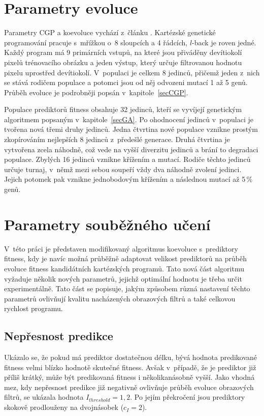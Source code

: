 \section{Parametry evoluce}

Parametry CGP a koevoluce vychází z~článku \cite{SikuPPSN}. Kartézské genetické programování pracuje s~mřížkou o~8 sloupcích a 4 řádcích, $l$-back je roven jedné. Každý program má 9 primárních vstupů, na které jsou přiváděny devítiokolí pixelů trénovacího obrázku a jeden výstup, který určuje filtrovanou hodnotu pixelu uprostřed devítiokolí. V~populaci je celkem 8 jedinců, přičemž jeden z~nich se stává rodičem populace a potomci jsou od něj odvozeni mutací 1 až 5 genů. Průběh evoluce je podrobněji popsán v~kapitole~\ref{secCGP}.

Populace prediktorů fitness obsahuje 32 jedinců, kteří se vyvíjejí genetickým algoritmem popsaným v~kapitole~\ref{secGA}. Po ohodnocení jedinců v~populaci je tvořena nová třemi druhy jedinců. Jedna čtvrtina nové populace vznikne prostým zkopírováním nejlepších 8 jedinců z~předešlé generace. Druhá čtvrtina je vytvořena zcela náhodně, což vede na vyšší diverzitu jedinců a brání to degradaci populace. Zbylých 16 jedinců vznikne křížením a mutací. Rodiče těchto jedinců určuje turnaj, v~němž mezi sebou soupeří vždy dva náhodně zvolení jedinci. Jejich potomek pak vznikne jednobodovým křížením a následnou mutací až 5\,\% genů.

\section{Parametry souběžného učení}

V~této práci je představen modifikovaný algoritmus koevoluce s~prediktory fitness, kdy je navíc možná průběžně adaptovat velikost prediktorů na průběh evoluce fitness kandidátních kartézských programů. Tato nová část algoritmu vyžaduje několik nových parametrů, jejichž optimální hodnotu je třeba určit experimentálně. Tato část se popisuje, jakým způsobem různá nastavení těchto parametrů ovlivňují kvalitu nacházených obrazových filtrů a také celkovou rychlost programu.

\subsection{Nepřesnost predikce}

Ukázalo se, že pokud má prediktor dostatečnou délku, bývá hodnota predikované fitness velmi blízko hodnotě skutečné fitness. Avšak v~případě, že je prediktor již příliš krátký, může být predikovaná fitness i několikanásobně vyšší. Jako vhodná mez, kdy nepřesnost predikce již negativně ovlivňuje průběh evoluce obrazových filtrů, se ukázala hodnota $I_\mathit{threshold} = 1,2$. Po jejím překročení jsou prediktory skokově prodlouženy na dvojnásobek ($c_I = 2$).

